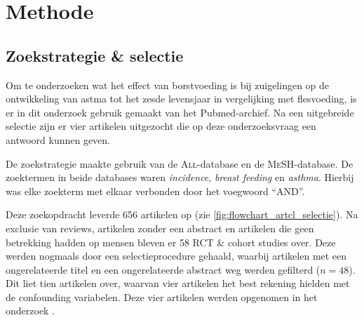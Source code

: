\documentclass[table,abstract=true]{scrartcl}
\begin{document}
\section{Methode}
    \subsection{Zoekstrategie \& selectie}
    Om te onderzoeken wat het effect van borstvoeding is bij zuigelingen op de ontwikkeling van astma tot het zesde levensjaar in vergelijking met flesvoeding, is er in dit onderzoek gebruik gemaakt van het Pubmed-archief. Na een uitgebreide selectie zijn er vier artikelen uitgezocht die op deze onderzoeksvraag een antwoord kunnen geven.\hfil

    De zoekstrategie maakte gebruik van de \textsc{All}-database en de \textsc{MeSH}-database. De zoektermen in beide databases waren \emph{incidence}, \emph{breast feeding} en \emph{asthma}. Hierbij was elke zoekterm met elkaar verbonden door het voegwoord ``\uppercase{and}''.

Deze zoekopdracht leverde 656 artikelen op (zie \cref{fig:flowchart_artcl_selectie}). Na exclusie van reviews, artikelen zonder een abstract en artikelen die geen betrekking hadden op mensen bleven er 58 RCT \& cohort studies over. Deze werden nogmaals door een selectieprocedure gehaald, waarbij artikelen met een ongerelateerde titel en een ongerelateerde abstract weg werden gefilterd ($n = 48$).
Dit liet tien artikelen over, waarvan vier artikelen het best rekening hielden met de confounding variabelen. Deze vier artikelen werden opgenomen in het onderzoek \cite{chandra1997five,den_Dekker_2016,oddy1999association,dell2001breastfeeding}.


\end{document}
